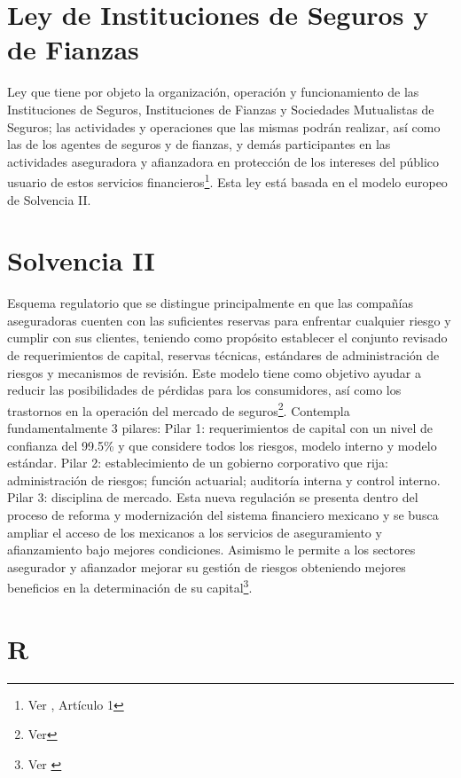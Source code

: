 \documentclass[11pt,twoside,openright,spanish]{report}
\numberwithin{equation}{chapter}
\numberwithin{figure}{chapter}
\numberwithin{table}{chapter}
\begin{document}
	\section{Ley de Instituciones de Seguros y de Fianzas}

	Ley que tiene por objeto la organización, operación y funcionamiento de las Instituciones de Seguros, Instituciones de Fianzas y Sociedades Mutualistas de Seguros; las actividades y operaciones que las mismas podrán realizar, así como las de los agentes de seguros y de fianzas, y demás participantes en las actividades aseguradora y afianzadora en protección de los intereses del público usuario de estos servicios financieros\footnote{Ver \citet{GLisf}, Artículo 1}. Esta ley está basada en el modelo europeo de Solvencia II.
	
    \section{Solvencia II}

	Esquema regulatorio que se distingue principalmente en que las compañías aseguradoras cuenten con las suficientes reservas para enfrentar cualquier riesgo y cumplir con sus clientes, teniendo como propósito establecer el conjunto revisado de requerimientos de capital, reservas técnicas, estándares de administración de riesgos y mecanismos de revisión. Este modelo tiene como objetivo ayudar a reducir las posibilidades de pérdidas para los consumidores, así como los trastornos en la operación del mercado de seguros\footnote{Ver\citet{JSolvenciaII}}. Contempla fundamentalmente 3 pilares:
	Pilar 1: requerimientos de capital con un nivel de confianza del 99.5\% y que considere todos los riesgos, modelo interno y modelo estándar.
	Pilar 2: establecimiento de un gobierno corporativo que rija: administración de riesgos; función actuarial; auditoría interna y control interno.
	Pilar 3: disciplina de mercado. 
	Esta nueva regulación se presenta dentro del proceso de reforma y modernización del sistema financiero mexicano y se busca ampliar el acceso de los mexicanos a los servicios de aseguramiento y afianzamiento bajo mejores condiciones. Asimismo le permite a los sectores asegurador y afianzador mejorar su gestión de riesgos obteniendo mejores beneficios en la determinación de su capital\footnote{Ver \citet{KPilaresSolvenciaII}}.
	
	\section{R}
\end{document}
